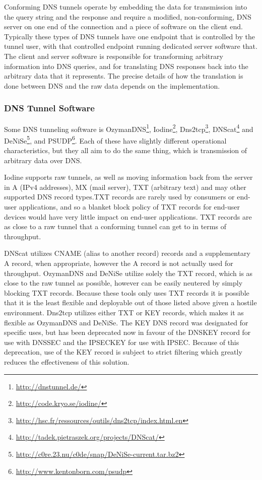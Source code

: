 \documentclass[12pt]{report}
\theoremstyle{remark}
\theoremstyle{definition}
\theoremstyle{definition}
\theoremstyle{definition}
\begin{document}
Conforming DNS tunnels operate by embedding the data for transmission into the
query string and the response and require a modified, non-conforming, DNS
server on one end of the connection and a piece of software on the client end.
Typically these types of DNS tunnels have one endpoint that is controlled by the 
tunnel user, with that controlled endpoint running dedicated server software
that. The client and server software is responsible for transforming arbitrary
information into DNS queries, and for translating DNS responses back into the
arbitrary data that it represents. The precise details of how the translation
is done between DNS and the raw data depends on the implementation.

\subsubsection{DNS Tunnel Software}

Some DNS tunneling software is OzymanDNS\footnote{\url{http://dnstunnel.de/}},
Iodine\footnote{\url{http://code.kryo.se/iodine/}},
Dns2tcp\footnote{\url{http://hsc.fr/ressources/outils/dns2tcp/index.html.en}},
DNScat\footnote{\url{http://tadek.pietraszek.org/projects/DNScat/}} and
DeNiSe\footnote{\url{http://c0re.23.nu/c0de/snap/DeNiSe-current.tar.bz2}}, and
PSUDP\footnote{\url{http://www.kentonborn.com/psudp}}. Each of these have
slightly different operational characteristics, but they all aim to do the same
thing, which is transmission of arbitrary data over DNS.

Iodine supports raw tunnels, as well as moving information back from the server
in A (IPv4 addresses), MX (mail server), TXT (arbitrary text) and may other
supported DNS record types.TXT records are rarely used by
consumers or end-user applications, and so a blanket block policy of TXT
records for end-user devices would have very little impact on end-user
applications. TXT records are as close to a raw tunnel that a conforming
tunnel can get to in terms of throughput.

DNScat utilizes CNAME (alias to
another record) records and a supplementary A record, when appropriate, however
the A record is not actually used for throughput. OzymanDNS and DeNiSe utilize
solely the
TXT record, which is as close to the raw tunnel as possible, however can be
easily neutered by simply blocking TXT records. Because these tools only uses
TXT records it is possible that it is the least flexible and deployable out of
those listed above given a hostile environment. Dns2tcp utilizes either TXT or
KEY records, which makes it as flexible as OzymanDNS and DeNiSe. The KEY DNS
record was designated for specific uses\cite{rfc2931}, but has been
deprecated now\cite{rfc3445} in favour of the DNSKEY record for use with
DNSSEC\cite{rfc3755} and the IPSECKEY for use with
IPSEC\cite{rfc4025}. Because of this deprecation, use of the KEY record is
subject to strict filtering which greatly reduces the effectiveness of this
solution.
\end{document}

